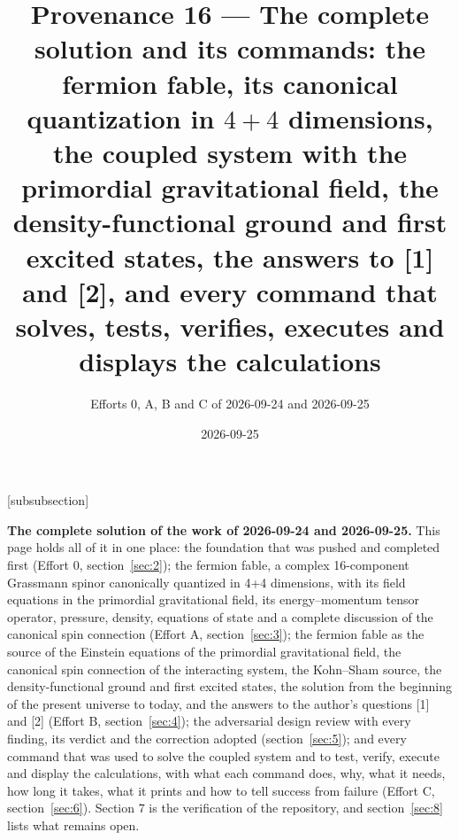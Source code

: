 \newcommand{\cftt}[1]{{\ttfamily\spaceskip=0.5em plus 0.6em minus 0.1em\relax #1}}
\makeatletter
{}[subsubsection]
\renewcommand{\thecfsss}{\thesubsubsection.\arabic{cfsss}}
\def\theHcfsss{\theHsubsubsection.\arabic{cfsss}}
\newcommand{\cfsubsubsubsection}{\@startsection{cfsss}{3}{\z@}%
  {-2.5ex\@plus -1ex \@minus -.2ex}{1ex \@plus .2ex}{\normalfont\normalsize\bfseries}}
\let\cfsssmark\@gobble
\newcommand*{\l@cfsss}{\@dottedtocline{4}{10em}{5em}}
\def\toclevel@cfsss{4}
\makeatother

\setlength{\emergencystretch}{3em}

\title{Provenance 16 --- The complete solution and its commands: the fermion fable, its canonical
quantization in $4+4$ dimensions, the coupled system with the primordial gravitational field, the
density-functional ground and first excited states, the answers to [1] and [2], and every command that
solves, tests, verifies, executes and displays the calculations}
\author{Efforts 0, A, B and C of 2026-09-24 and 2026-09-25}
\date{2026-09-25}


\maketitle
\textbf{The complete solution of the work of 2026-09-24 and 2026-09-25.} This page holds all of it in one place: the foundation that was pushed and completed first (Effort 0, section~\ref{sec:2}); the fermion fable, a complex 16-component Grassmann spinor canonically quantized in 4+4 dimensions, with its field equations in the primordial gravitational field, its energy--momentum tensor operator, pressure, density, equations of state and a complete discussion of the canonical spin connection (Effort A, section~\ref{sec:3}); the fermion fable as the source of the Einstein equations of the primordial gravitational field, the canonical spin connection of the interacting system, the Kohn--Sham source, the density-functional ground and first excited states, the solution from the beginning of the present universe to today, and the answers to the author's questions [1] and [2] (Effort B, section~\ref{sec:4}); the adversarial design review with every finding, its verdict and the correction adopted (section~\ref{sec:5}); and every command that was used to solve the coupled system and to test, verify, execute and display the calculations, with what each command does, why, what it needs, how long it takes, what it prints and how to tell success from failure (Effort C, section~\ref{sec:6}). Section 7 is the verification of the repository, and section~\ref{sec:8} lists what remains open.

